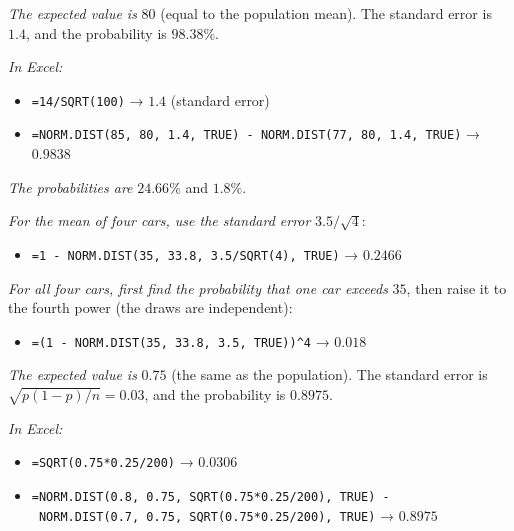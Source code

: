 \documentclass[
  11pt,
  letterpaper,
  DIV=11,
  numbers=noendperiod,
  oneside,
  open=any]{scrreprt}
\providecommand{\tightlist}{%
  \setlength{\itemsep}{0pt}\setlength{\parskip}{0pt}}\usepackage{longtable,booktabs,array}
\newenvironment{bsanswerkey}[2]{%
  \begin{tcolorbox}[bsbase, colback=bspaper2, colframe=bsline, fontupper=\small,
    title={\hypertarget{a-#1}{}\label{a-#1}\hyperlink{q-#1}{\textcolor{bsink2}{\MakeUppercase{#2}}}\hfill
      \hyperlink{q-#1}{\textcolor{bsaccent}{\normalfont\footnotesize back to page \pageref{q-#1}}}}]}%
  {\end{tcolorbox}}
\begin{document}
\begin{bsanswerkey}{bsans107}{Exercise 2, question 1}

\emph{The expected value is} \(80\) (equal to the population mean). The
standard error is \(1.4\), and the probability is \(98.38\%\).

\emph{In Excel:}

\begin{itemize}
\tightlist
\item
  \texttt{=14/SQRT(100)} → \(1.4\) (standard error)
\item
  \texttt{=NORM.DIST(85,\ 80,\ 1.4,\ TRUE)\ -\ NORM.DIST(77,\ 80,\ 1.4,\ TRUE)}
  → \(0.9838\)
\end{itemize}

\end{bsanswerkey}

\begin{bsanswerkey}{bsans108}{Exercise 2, question 2}

\emph{The probabilities are} \(24.66\%\) and \(1.8\%\).

\emph{For the mean of four cars, use the standard error}
\(3.5/\sqrt{4}\):

\begin{itemize}
\tightlist
\item
  \texttt{=1\ -\ NORM.DIST(35,\ 33.8,\ 3.5/SQRT(4),\ TRUE)} → \(0.2466\)
\end{itemize}

\emph{For all four cars, first find the probability that one car
exceeds} \(35\), then raise it to the fourth power (the draws are
independent):

\begin{itemize}
\tightlist
\item
  \texttt{=(1\ -\ NORM.DIST(35,\ 33.8,\ 3.5,\ TRUE))\^{}4} → \(0.018\)
\end{itemize}

\end{bsanswerkey}

\begin{bsanswerkey}{bsans109}{Exercise 3, question 1}

\emph{The expected value is} \(0.75\) (the same as the population). The
standard error is \(\sqrt{p(1-p)/n} = 0.03\), and the probability is
\(0.8975\).

\emph{In Excel:}

\begin{itemize}
\tightlist
\item
  \texttt{=SQRT(0.75*0.25/200)} → \(0.0306\)
\item
  \texttt{=NORM.DIST(0.8,\ 0.75,\ SQRT(0.75*0.25/200),\ TRUE)\ -\ NORM.DIST(0.7,\ 0.75,\ SQRT(0.75*0.25/200),\ TRUE)}
  → \(0.8975\)
\end{itemize}

\end{bsanswerkey}
\end{document}
